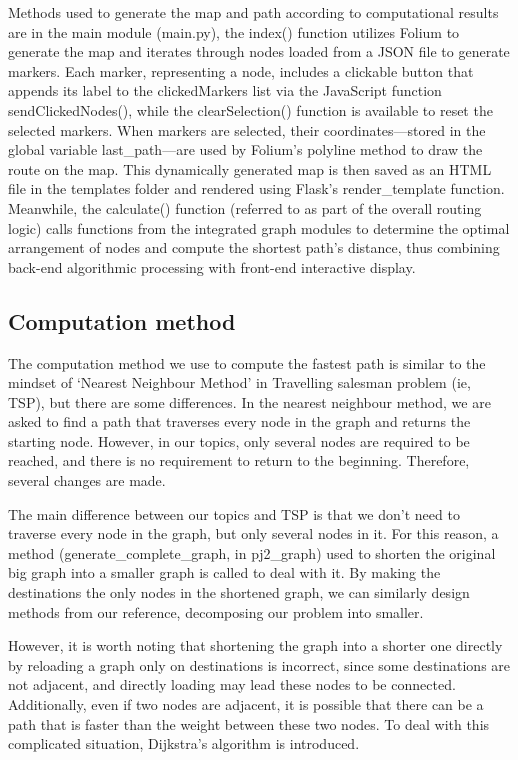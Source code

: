 \documentclass[12pt]{article}
\begin{document}
	Methods used to generate the map and path according to computational results are in the main module (main.py), the index() function utilizes Folium to generate the map and iterates through nodes loaded from a JSON file to generate markers. Each marker, representing a node, includes a clickable button that appends its label to the clickedMarkers list via the JavaScript function sendClickedNodes(), while the clearSelection() function is available to reset the selected markers. When markers are selected, their coordinates—stored in the global variable last\_path—are used by Folium’s polyline method to draw the route on the map. This dynamically generated map is then saved as an HTML file in the templates folder and rendered using Flask’s render\_template function. Meanwhile, the calculate() function (referred to as part of the overall routing logic) calls functions from the integrated graph modules to determine the optimal arrangement of nodes and compute the shortest path’s distance, thus combining back-end algorithmic processing with front-end interactive display.
	
	\subsection*{Computation method}
	The computation method we use to compute the fastest path is similar to the mindset of ‘Nearest Neighbour Method’\cite{noauthor_nearest_nodate} in Travelling salesman problem\cite{noauthor_travelling_nodate} (ie, TSP), but there are some differences. In the nearest neighbour method, we are asked to find a path that traverses every node in the graph and returns the starting node. However, in our topics, only several nodes are required to be reached, and there is no requirement to return to the beginning. Therefore, several changes are made.
	
	The main difference between our topics and TSP is that we don’t need to traverse every node in the graph, but only several nodes in it. For this reason, a method (generate\_complete\_graph, in pj2\_graph)  used to shorten the original big graph into a smaller graph is called to deal with it. By making the destinations the only nodes in the shortened graph, we can similarly design methods from our reference, decomposing our problem into smaller.
	
	However, it is worth noting that shortening the graph into a shorter one directly by reloading a graph only on destinations is incorrect, since some destinations are not adjacent, and directly loading may lead these nodes to be connected. Additionally, even if two nodes are adjacent, it is possible that there can be a path that is faster than the weight between these two nodes. To deal with this complicated situation, Dijkstra’s algorithm is introduced.
	
\end{document}
